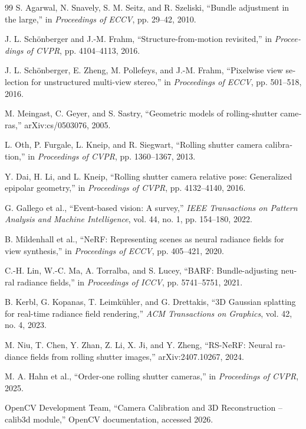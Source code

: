 \documentclass[12pt,openany,oneside]{book}
\begin{document}
\begin{latin}
\begin{thebibliography}{99}
S. Agarwal, N. Snavely, S. M. Seitz, and R. Szeliski,
``Bundle adjustment in the large,''
in \textit{Proceedings of ECCV}, pp. 29--42, 2010.

J. L. Schönberger and J.-M. Frahm,
``Structure-from-motion revisited,''
in \textit{Proceedings of CVPR}, pp. 4104--4113, 2016.

J. L. Schönberger, E. Zheng, M. Pollefeys, and J.-M. Frahm,
``Pixelwise view selection for unstructured multi-view stereo,''
in \textit{Proceedings of ECCV}, pp. 501--518, 2016.

M. Meingast, C. Geyer, and S. Sastry,
``Geometric models of rolling-shutter cameras,''
arXiv:cs/0503076, 2005.

L. Oth, P. Furgale, L. Kneip, and R. Siegwart,
``Rolling shutter camera calibration,''
in \textit{Proceedings of CVPR}, pp. 1360--1367, 2013.

Y. Dai, H. Li, and L. Kneip,
``Rolling shutter camera relative pose: Generalized epipolar geometry,''
in \textit{Proceedings of CVPR}, pp. 4132--4140, 2016.

G. Gallego et al.,
``Event-based vision: A survey,''
\textit{IEEE Transactions on Pattern Analysis and Machine Intelligence}, vol. 44, no. 1, pp. 154--180, 2022.

B. Mildenhall et al.,
``NeRF: Representing scenes as neural radiance fields for view synthesis,''
in \textit{Proceedings of ECCV}, pp. 405--421, 2020.

C.-H. Lin, W.-C. Ma, A. Torralba, and S. Lucey,
``BARF: Bundle-adjusting neural radiance fields,''
in \textit{Proceedings of ICCV}, pp. 5741--5751, 2021.

B. Kerbl, G. Kopanas, T. Leimkühler, and G. Drettakis,
``3D Gaussian splatting for real-time radiance field rendering,''
\textit{ACM Transactions on Graphics}, vol. 42, no. 4, 2023.

M. Niu, T. Chen, Y. Zhan, Z. Li, X. Ji, and Y. Zheng,
``RS-NeRF: Neural radiance fields from rolling shutter images,''
arXiv:2407.10267, 2024.

M. A. Hahn et al.,
``Order-one rolling shutter cameras,''
in \textit{Proceedings of CVPR}, 2025.

OpenCV Development Team,
``Camera Calibration and 3D Reconstruction -- calib3d module,''
OpenCV documentation, accessed 2026.


\end{thebibliography}
\end{latin}
\end{document}
